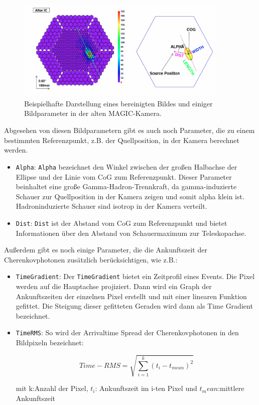 \begin{figure}
    \centering
    \includegraphics[width=0.9\textwidth]{./Plots/CleaningBild.png}
    \caption{Beispielhafte Darstellung eines bereinigten Bildes und einiger Bildparameter in der alten MAGIC-Kamera.}
    \label{CleaningBild}
\end{figure}

Abgesehen von diesen Bildparametern gibt es auch noch Parameter, die zu einem bestimmten Referenzpunkt, z.B. der Quellposition, in der Kamera berechnet werden. 

\begin{itemize}
 \item \texttt{Alpha}: \texttt{Alpha} bezeichnet den Winkel zwischen der großen Halbachse der Ellipse und der Linie vom CoG zum Referenzpunkt.
 Dieser Parameter beinhaltet eine große Gamma-Hadron-Trennkraft, da gamma-induzierte Schauer zur Quellposition in der Kamera zeigen und somit alpha klein ist.
 Hadroninduzierte Schauer sind isotrop in der Kamera verteilt.
 \item \texttt{Dist}: \texttt{Dist} ist der Abstand vom CoG zum Referenzpunkt und bietet Informationen über den Abstand von Schauermaximum zur Teleskopachse.
\end{itemize}

Außerdem gibt es noch einige Parameter, die die Ankunftszeit der Cherenkovphotonen zusätzlich berücksichtigen, wie z.B.:

\begin{itemize}
 \item \texttt{TimeGradient}: Der \texttt{TimeGradient} bietet ein Zeitprofil eines Events.
 Die Pixel werden auf die Hauptachse projiziert.
 Dann wird ein Graph der Ankunftszeiten der einzelnen Pixel erstellt und mit einer linearen Funktion gefittet.
 Die Steigung dieser gefitteten Geraden wird dann als Time Gradient bezeichnet.
 \item \texttt{TimeRMS}: So wird der Arrivaltime Spread der Cherenkovphotonen in den Bildpixeln bezeichnet:
 
\begin{equation}
 Time-RMS=\sqrt{\sum_{i=1}^k (t_i-t_{mean})^2}
\end{equation}
 \begin{centering}
  \tiny{mit k:Anzahl der Pixel, $t_i$: Ankunftszeit im i-ten Pixel und $t_mean$:mittlere Ankunftszeit}
 \end{centering}


\end{itemize}

